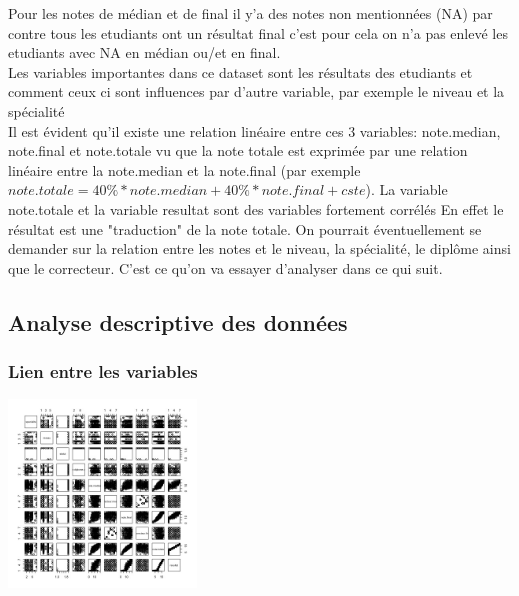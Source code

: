 \documentclass[]{report}
\begin{document}
Pour les notes de médian et de final il y'a des notes non mentionnées (NA) par contre tous les etudiants ont un résultat final c'est pour cela on n'a pas enlevé les etudiants avec NA en médian ou/et en final.\\
Les variables importantes dans ce dataset sont les résultats des etudiants et comment ceux ci sont influences par d'autre variable, par exemple le niveau et la spécialité\\
Il est évident qu'il existe une relation linéaire entre ces 3 variables: note.median, note.final et note.totale vu que la note totale est exprimée par une relation linéaire entre la note.median et la note.final (par exemple $note.totale = 40\% * note.median + 40\% * note.final + cste$). La variable note.totale et la variable resultat sont des variables fortement corrélés En effet le résultat est une "traduction"  de la note totale. On pourrait éventuellement se demander sur la relation entre les notes et le niveau, la spécialité, le diplôme ainsi que le correcteur. C'est ce qu'on va essayer d'analyser dans ce qui suit. 

 \subsection{Analyse descriptive des données}

\subsubsection{Lien entre les variables}
	\begin{center}
	\includegraphics[width=50mm]{Figures/Notes/multiplot.jpg}
	\label{fig:multiplot_notes}
\end{center}
\end{document}
